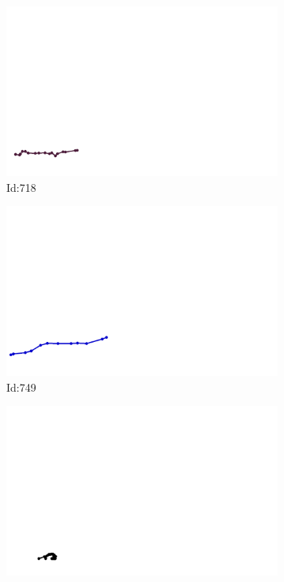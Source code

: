 \documentclass[12pt,twoside]{report}
\begin{document}
\begin{figure}
\centering
\begin{subfigure}[b]{0.20\textwidth}
\centering
\includegraphics[width=\textwidth]{../../trajectories/718.png}
\caption{Id:718}
\end{subfigure}
\begin{subfigure}[b]{0.20\textwidth}
\centering
\includegraphics[width=\textwidth]{../../trajectories/749.png}
\caption{Id:749}
\end{subfigure}
\begin{subfigure}[b]{0.20\textwidth}
\centering
\includegraphics[width=\textwidth]{../../trajectories/871.png}

\end{subfigure}
\end{figure}
\end{document}
